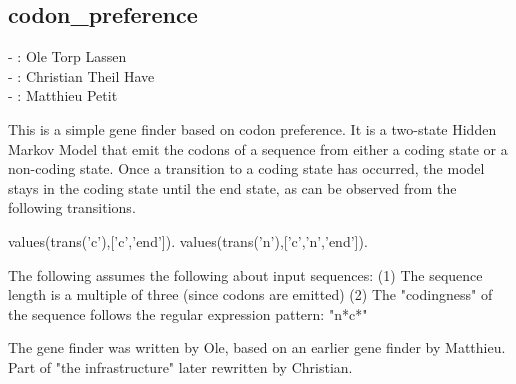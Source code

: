 


\subsection{codon_preference}

\label{sec:codonpreference}

\begin{tags}
- : Ole Torp Lassen \\- : Christian Theil Have \\- : Matthieu Petit
\end{tags}

This is a simple gene finder based on codon preference.
It is a two-state Hidden Markov Model that emit the codons of a sequence from either a coding state or a non-coding state.
Once a transition to a coding state has occurred, the model stays in the coding state until the end state, as can be observed
from the following transitions.

\begin{code}
values(trans('c'),['c','end']).
values(trans('n'),['c','n','end']).
\end{code}

The following assumes the following about input sequences:
(1) The sequence length is a multiple of three (since codons are emitted)
(2) The "codingness" of the sequence follows the regular expression pattern: "n\bsl{}*c\bsl{}*"

The gene finder was written by Ole, based on an earlier gene finder by Matthieu.
Part of "the infrastructure" later rewritten by Christian.\vspace{0.7cm}

